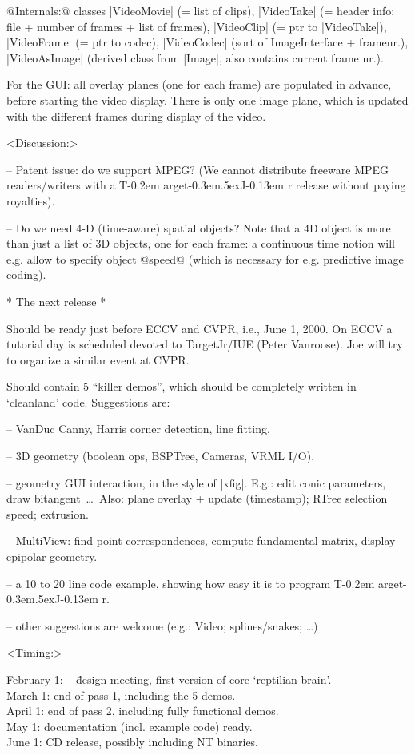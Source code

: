 \documentclass[11pt]{article}
\def\TargetJr{{T\kern-0.2em arget\kern-0.3em\lower.5ex\hbox{\Large J}\kern-0.13em r}}
\begin{document}
@Internals:@ classes |VideoMovie| (= list of clips), |VideoTake| (= header info:
file + number of frames + list of frames), |VideoClip| (= ptr to |VideoTake|),
|VideoFrame| (= ptr to codec), |VideoCodec| (sort of ImageInterface + framenr.),
|VideoAsImage| (derived class from |Image|, also contains current frame nr.).

For the GUI: all overlay planes (one for each frame) are populated in advance,
before starting the video display.  There is only one image plane, which is
updated with the different frames during display of the video.

<Discussion:>

-- Patent issue: do we support MPEG?  (We cannot distribute freeware MPEG
readers/writers with a \TargetJr{} release without paying royalties).

-- Do we need 4-D (time-aware) spatial objects?  Note that a 4D object is more
than just a list of 3D objects, one for each frame: a continuous time notion
will e.g. allow to specify object @speed@ (which is necessary for e.g.
predictive image coding).


* The next release *

Should be ready just before ECCV and CVPR, i.e., June 1, 2000.  On ECCV a
tutorial day is scheduled devoted to TargetJr/IUE (Peter Vanroose).  Joe
will try to organize a similar event at CVPR.

Should contain 5 ``killer demos'', which should be completely written in
`cleanland' code.  Suggestions are:

-- VanDuc Canny, Harris corner detection, line fitting.

-- 3D geometry (boolean ops, BSPTree, Cameras, VRML I/O).

-- geometry GUI interaction, in the style of |xfig|.
E.g.: edit conic parameters, draw bitangent~\ldots\
Also: plane overlay + update (timestamp); RTree selection speed; extrusion.

-- MultiView: find point correspondences, compute fundamental matrix, display
epipolar geometry.

-- a 10 to 20 line code example, showing how easy it is to program \TargetJr.

-- other suggestions are welcome (e.g.: Video; splines/snakes; \ldots)


<Timing:>

  \begin{tabbing}
February 1: ~ \= design meeting, first version of core `reptilian brain'. \\
March 1:      \> end of pass 1, including the 5 demos.                    \\
April 1:      \> end of pass 2, including fully functional demos.         \\
May 1:        \> documentation (incl. example code) ready.                \\
June 1:       \> CD release, possibly including NT binaries.
  \end{tabbing}
\end{document}
